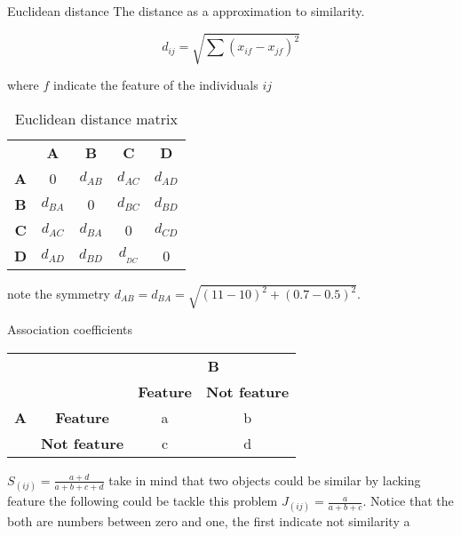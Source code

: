 \documentclass{beamer}
\begin{document}
\begin{frame}{Euclidean distance}
The distance as a approximation to similarity.

\begin{equation}
d_{ij} = \sqrt{\sum(x_{if} - x_{jf})^{2}}
\end{equation}

where $f$ indicate the feature of the individuals $ij$

\begin{table}[]
\begin{tabular}{ccccc}
\multicolumn{1}{l}{}            & \textbf{A} & \textbf{B} & \textbf{C} & \textbf{D} \\ \cline{2-5} 
\multicolumn{1}{c|}{\textbf{A}} & 0          & $d_{AB}$   & $d_{AC}$   & $d_{AD}$   \\
\multicolumn{1}{c|}{\textbf{B}} & $d_{BA}$   & 0          & $d_{BC}$   & $d_{BD}$   \\
\multicolumn{1}{c|}{\textbf{C}} & $d_{AC}$   & $d_{BA}$   & 0          & $d_{CD}$   \\
\multicolumn{1}{c|}{\textbf{D}} & $d_{AD}$   & $d_{BD}$   & $d__{DC}$  & 0         
\end{tabular}
\caption{Euclidean distance matrix}
\end{table}
note the symmetry $d_{AB} = d_{BA} = \sqrt{(11-10)^{2} + (0.7 - 0.5)^{2}}$.
\end{frame}

\begin{frame}{Association coefficients}
\begin{table}[]
\begin{tabular}{cccc}
                            &                                           & \multicolumn{2}{c}{\textbf{B}}          \\
                            &                                           & \textbf{Feature} & \textbf{Not feature} \\ \cline{3-4} 
\multirow{}{}{\textbf{A}} & \multicolumn{1}{c|}{\textbf{Feature}}     & a                & b                    \\
                            & \multicolumn{1}{c|}{\textbf{Not feature}} & c                & d                   
\end{tabular}
\end{table}
$S_{(ij)} = \frac{a+d}{a+b+c+d}$ take in mind that two objects could be similar by lacking feature the following could be tackle this problem $J_{(ij)} = \frac{a}{a+b+c}$. Notice that the both are numbers between zero and one, the first indicate not similarity a
\end{frame}
\end{document}
